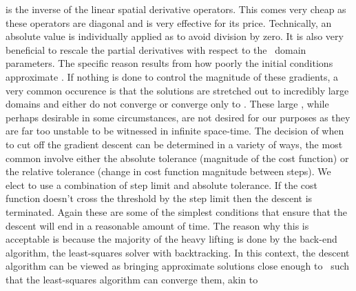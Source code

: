 is the inverse of the linear spatial derivative operators. This comes very cheap
as these operators are diagonal and is very effective for its price. Technically,
an absolute value is individually applied as to avoid division by zero. It is
also very beneficial to rescale the partial derivatives with respect to the
\spt\ domain parameters. The specific reason results from how poorly the
initial conditions approximate \twots. If nothing is done to control the
magnitude of these gradients, a very common occurence is that the solutions
are stretched out to incredibly large domains and either do not converge
or converge only to \eqva. These large \eqva, while perhaps desirable in
some circumstances, are not desired for our purposes as they are far
too unstable to be witnessed in infinite space-time.
The decision of when to cut off the gradient descent can
be determined in a variety of ways, the most common involve either the
absolute tolerance (magnitude of the cost function) or the relative tolerance
(change in cost function magnitude between steps).
We elect to use a combination of step limit and absolute tolerance. If the
cost function doesn't cross the threshold by the step limit then the descent is terminated.
Again these are some of the simplest conditions that ensure that the descent
will end in a reasonable amount of time.
The reason why this is acceptable is because the majority
of the heavy lifting is done by the back-end algorithm, the least-squares solver with backtracking.
In this context, the descent algorithm can be viewed as bringing approximate solutions
close enough to \twots\ such that the least-squares algorithm can converge them, akin
to 



